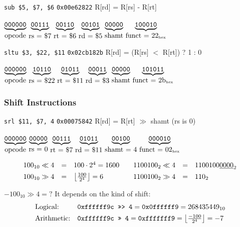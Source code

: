 \documentclass[a4paper, 11pt]{article}
\theoremstyle{definition}
\begin{document}
\begin{center}
\texttt{sub \$5, \$7, \$6} \qquad \texttt{0x00e62822} \qquad R[rd] = R[rs] - R[rt]

\vspace{1ex}
$\underbrace{\texttt{000000}}_{\mbox{opcode}}\,
 \underbrace{\texttt{00111}}_{\mbox{rs = \$7}}\,
 \underbrace{\texttt{00110}}_{\mbox{rt = \$6}}\,
 \underbrace{\texttt{00101}}_{\mbox{rd = \$5}}\,
 \underbrace{\texttt{00000}}_{\mbox{shamt}}\,
 \underbrace{\texttt{100010}}_{\mbox{funct = 22}_{\rm hex}}$

\vspace{4ex}
\texttt{sltu \$3, \$22, \$11} \qquad \texttt{0x02cb182b} \qquad R[rd] = (R[rs] $<$ R[rt]) ? 1 : 0

\vspace{1ex}
$\underbrace{\texttt{000000}}_{\mbox{opcode}}\,
 \underbrace{\texttt{10110}}_{\mbox{rs = \$22}}\,
 \underbrace{\texttt{01011}}_{\mbox{rt = \$11}}\,
 \underbrace{\texttt{00011}}_{\mbox{rd = \$3}}\,
 \underbrace{\texttt{00000}}_{\mbox{shamt}}\,
 \underbrace{\texttt{101011}}_{\mbox{funct = 2b}_{\rm hex}}$
\end{center}

\subsubsection{Shift Instructions}
\begin{center}
\texttt{srl \$11, \$7, 4} \qquad \texttt{0x00075842} \qquad R[rd] = R[rt] $\gg$ shamt \quad (rs is 0)

\vspace{1ex}
$\underbrace{\texttt{000000}}_{\mbox{opcode}}\,
 \underbrace{\texttt{00000}}_{\mbox{rs = 0}}\,
 \underbrace{\texttt{00111}}_{\mbox{rt = \$7}}\,
 \underbrace{\texttt{01011}}_{\mbox{rd = \$11}}\,
 \underbrace{\texttt{00100}}_{\mbox{shamt = 4}}\,
 \underbrace{\texttt{000010}}_{\mbox{funct = 02}_{\rm hex}}$
\end{center}

\[
\begin{array}{rcl@{\qquad}rcl}
100_{10} \ll 4 & = & 100 \cdot 2^4 = 1600
  & 1100100_2 \ll 4 & = & 1100100\underline{0000}_2 \\[1ex]
100_{10} \gg 4 & = & \left\lfloor \frac{100}{2^4} \right\rfloor = 6
  & 1100100_2 \gg 4 & = & 110_2
\end{array}
\]

\noindent $-100_{10} \gg 4 = {?}$ \quad It depends on the kind of shift:
\[
\begin{array}{l@{\quad}l}
\mbox{Logical:} & \texttt{0xffffff9c >>> 4} = \texttt{0x0ffffff9} = 268435449_{10} \\[1ex]
\mbox{Arithmetic:} & \texttt{0xffffff9c >> 4} = \texttt{0xfffffff9}
  = \left\lfloor \frac{-100}{2^4} \right\rfloor = -7
\end{array}
\]
\end{document}
